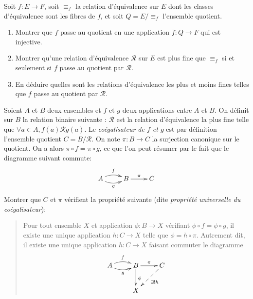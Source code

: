 \begin{exercice}
Soit $f : E\to F$, soit $\equiv_f$ la relation d'équivalence sur $E$ dont les classes d'équivalence sont les fibres de $f$, et soit $Q = E/\equiv_f$ l'ensemble quotient. 

\begin{enumerate}
\item Montrer que $f$ passe au quotient en une application $\bar f : Q\to F$ qui est injective.
\item Montrer qu'une relation d'équivalence $\mathcal R$ sur $E$ est plus fine que $\equiv_f$ si et seulement si $f$ passe au quotient par $\mathcal R$.
\item En déduire quelles sont les relations d'équivalence les plus et moins fines telles que $f$ passe au quotient par $\mathcal R$.
\end{enumerate}
\end{exercice}

\begin{exercice}[Coégalisateur]
Soient $A$ et $B$ deux ensembles et $f$ et $g$ deux applications entre $A$ et $B$. On définit sur $B$ la relation binaire suivante : $\mathcal R$ est la relation d'équivalence la plus fine telle que $\forall a\in A, f(a)\mathcal R g(a)$. Le \emph{coégalisateur de $f$ et $g$} est par définition l'ensemble quotient $C = B/\mathcal R$. On note $\pi : B \to C$ la surjection canonique sur le quotient. On a alors $\pi\circ f = \pi \circ g$, ce que l'on peut résumer par le fait que le diagramme suivant commute:
\[
\xymatrix{
 A\ar@/^/[r] ^{f} \ar@/_/[r]_{g} & B \ar[r]^{\pi} & C
}
\]
Montrer que $C$ et $\pi$ vérifient la propriété suivante (dite \emph{propriété universelle du coégalisateur}):
\begin{quote}
Pour tout ensemble $X$ et application $\phi : B \to X$ vérifiant $\phi\circ f = \phi\circ g$,  il existe une unique application $h : C\to X$ telle que $\phi = h \circ \pi $. Autrement dit, il existe une unique application $h : C\to X$ faisant commuter le diagramme 
\[
\xymatrix{
 A\ar@/^/[r] ^{f} \ar@/_/[r]_{g} & B \ar[r]^{\pi} \ar[d]^{\phi}& C\ar@{-->}[dl]^{\exists!h}\\
 & X & 
}
\]
\end{quote}
\end{exercice}




